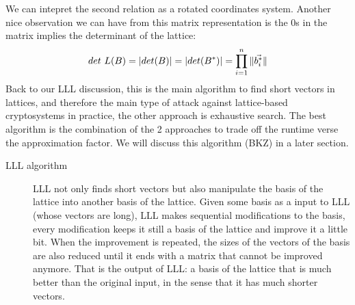     We can intepret the second relation as a rotated coordinates system. Another nice
    observation we can have from this matrix representation is the 0s in the matrix
    implies the determinant of the lattice:
    \[
        det \ L(B) = |det(B)| = |det(B^*)| = \prod_{i=1}^{n}\Vert \vec{b_i^*} \Vert
    \]
    Back to our LLL discussion, this is the main algorithm to find short vectors
    in lattices, and therefore the main type of attack against lattice-based
    cryptosystems in practice, the other approach is exhaustive search. The best
    algorithm is the combination of the 2 approaches to trade off the runtime
    verse the approximation factor. We will discuss this algorithm (BKZ) in a
    later section.

    \begin{description}
        \item[LLL algorithm] LLL not only finds short vectors but also
            manipulate the basis of the lattice into another basis of the
            lattice. Given some basis as a input to LLL (whose vectors are
            long), LLL makes sequential modifications to the basis, every
            modification keeps it still a basis of the lattice and improve it a
            little bit. When the improvement is repeated, the sizes of the
            vectors of the basis are also reduced until it ends with a matrix that
            cannot be improved anymore. That is the output of LLL: a basis of
            the lattice that is much better than the original input, in the
            sense that it has much shorter vectors.


\end{description}
